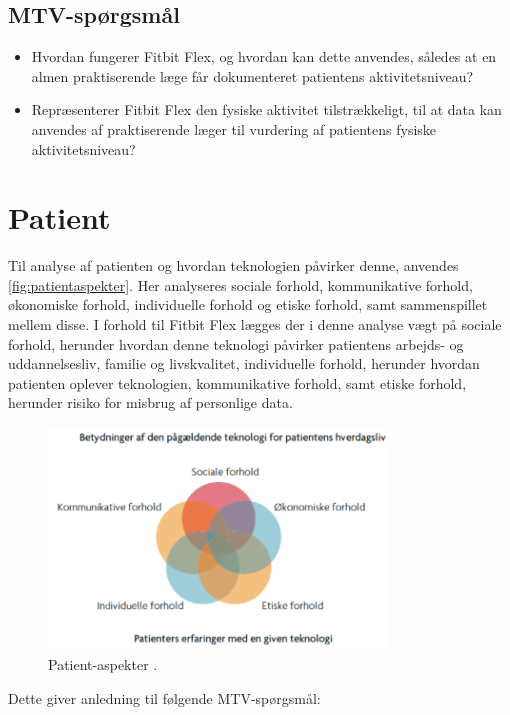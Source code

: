 \subsection{MTV-spørgsmål}
\begin{itemize}
\item Hvordan fungerer Fitbit Flex, og hvordan kan dette anvendes, således at en almen praktiserende læge får dokumenteret patientens aktivitetsniveau?
\item Repræsenterer Fitbit Flex den fysiske aktivitet tilstrækkeligt, til at data kan anvendes af praktiserende læger til vurdering af patientens fysiske aktivitetsniveau?
\end{itemize}

\section{Patient}\label{sec:metode_pat}
Til analyse af patienten og hvordan teknologien påvirker denne, anvendes \autoref{fig:patientaspekter}. Her analyseres sociale forhold, kommunikative forhold, økonomiske forhold, individuelle forhold og etiske forhold, samt sammenspillet mellem disse. I forhold til Fitbit Flex lægges der i denne analyse vægt på sociale forhold, herunder hvordan denne teknologi påvirker patientens arbejds- og uddannelsesliv, familie og livskvalitet, individuelle forhold, herunder hvordan patienten oplever teknologien, kommunikative forhold, samt etiske forhold, herunder risiko for misbrug af personlige data. 


\begin{figure}[H]
\centering
\includegraphics[width=0.8\textwidth]{figures/patientaspekter}
\caption{Patient-aspekter \citep{mtvhaandbog}.}
\label{fig:patientaspekter}
\end{figure}

\noindent
Dette giver anledning til følgende MTV-spørgsmål: 

